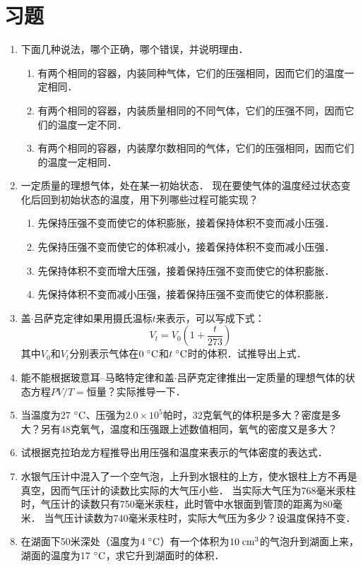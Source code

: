 \section*{习题}
\begin{enumerate}
    \item 下面几种说法，哪个正确，哪个错误，并说明理由．
    \begin{enumerate}
        \item 有两个相同的容器，内装同种气体，它们的压强相同，因而它们的温度一定相同．
        \item 有两个相同的容器，内装质量相同的不同气体，它们的压强不同，因而它们的温度一定不同．
        \item 有两个相同的容器，内装摩尔数相同的气体，它们的压强相同，因而它们的温度一定相同．
    \end{enumerate}
\item 一定质量的理想气体，处在某一初始状态．
现在要使气体的温度经过状态变化后回到初始状态的温度，用下列哪些过程可能实现？
\begin{enumerate}
    \item 先保持压强不变而使它的体积膨胀，接着保持体积不变而减小压强．
\item 先保持压强不变而使它的体积减小，接着保持体积不变而减小压强．
\item 先保持体积不变而增大压强，接着保持压强不变而使它的体积膨胀．
\item 先保持体积不变而减小压强，接着保持压强不变而使它的体积膨胀．     
\end{enumerate}
\item 盖$\cdot$吕萨克定律如果用摄氏温标$t$来表示，可以写成下式：
\[V_t=V_0\left(1+\frac{t}{273}\right) \]
其中$V_0$和$V_t$分别表示气体在$0 \;{}^\circ\text{C}$和$t \;{}^\circ\text{C}$时的体积．试推导出上式．
\item 能不能根据玻意耳--马略特定律和盖$\cdot$吕萨克定律推出一定质量的理想气体的状态方程$PV/T=$恒量？实际推导一下．
\item 当温度为27$\;{}^\circ\text{C}$、压强为$2.0\times 10^5$帕时，32克氧气的体积是多大？密度是多大？另有48克氧气，温度和压强跟上述数值相同，氧气的密度又是多大？    
\item   试根据克拉珀龙方程推导出用压强和温度来表示的气体密度的表达式．
\item  水银气压计中混入了一个空气泡，上升到水银柱的上方，使水银柱上方不再是真空，因而气压计的读数比实际的大气压小些．
当实际大气压为768毫米汞柱时，气压计的读数只有750毫米汞柱，此时管中水银面到管顶的距离为80毫米．
当气压计读数为740毫米汞柱时，实际大气压为多少？设温度保持不变．
\item  在湖面下50米深处（温度为$4 \;{}^\circ\text{C}$）有一个体积为$10 \;\text{cm}^3$的气泡升到湖面上来，湖面的温度为17$\;{}^\circ\text{C}$，求它升到湖面时的体积．

\end{enumerate}
